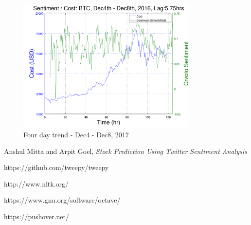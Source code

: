 \documentclass[12pt,journal,compsoc]{IEEEtran}
\begin{document}
\begin{figure}[h!]
	\centering
	\includegraphics[width=0.8\textwidth]{../Datasets/Plots/Dec4-8}
	\caption{Four day trend - Dec4 - Dec8, 2017}
	\label{fig:Dec4-8}
\end{figure}

\begin{thebibliography}{1}

Anshul Mitta and Arpit Goel, \textit{Stock Prediction Using Twitter Sentiment Analysis}

https://github.com/tweepy/tweepy

http://www.nltk.org/

https://www.gnu.org/software/octave/

https://pushover.net/

\end{thebibliography}
\end{document}
